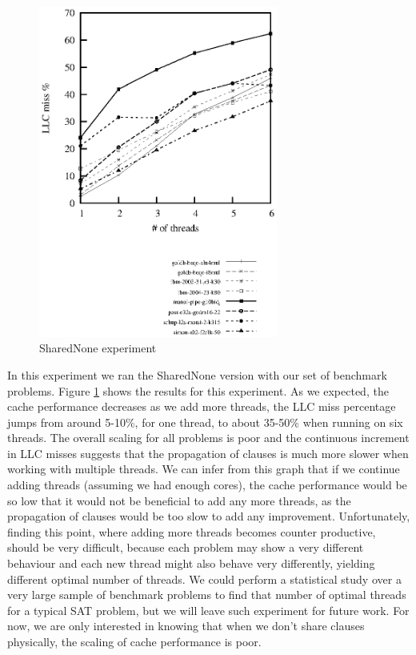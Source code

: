 \documentclass[12pt]{diicc}
\begin{document}
\begin{figure}[h!]
	\centering
		\includegraphics[width=0.7\textwidth]{shared-none}
	\caption{SharedNone experiment}
	\label{fig:shared-none}
\end{figure}

In this experiment we ran the SharedNone version with our set of benchmark problems. Figure \ref{fig:shared-none} shows the results for this experiment. As we expected, the cache performance decreases as we add more threads, the LLC miss percentage jumps from around 5-10\%, for one thread, to about 35-50\% when running on six threads. The overall scaling for all problems is poor and the continuous increment in LLC misses suggests that the propagation of clauses is much more slower when working with multiple threads. We can infer from this graph that if we continue adding threads (assuming we had enough cores), the cache performance would be so low that it would not be beneficial to add any more threads, as the propagation of clauses would be too slow to add any improvement. Unfortunately, finding this point, where adding more threads becomes counter productive, should be very difficult, because each problem may show a very different behaviour and each new thread might also behave very differently, yielding different optimal number of threads. We could perform a statistical study over a very large sample of benchmark problems to find that number of optimal threads for a typical SAT problem, but we will leave such experiment for future work. For now, we are only interested in knowing that when we don't share clauses physically, the scaling of cache performance is poor.
\end{document}
